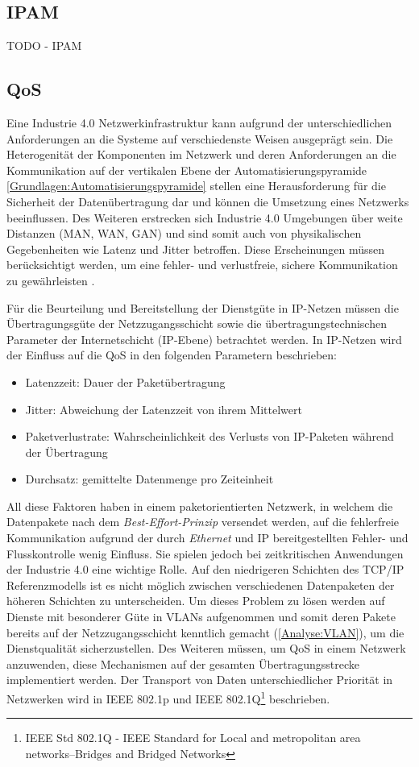 \subsection{IPAM}
TODO - IPAM

\subsection{\ac{QoS}}
Eine Industrie 4.0 Netzwerkinfrastruktur kann aufgrund der unterschiedlichen Anforderungen an die Systeme auf verschiedenste Weisen ausgeprägt sein. Die Heterogenität der Komponenten im Netzwerk und deren Anforderungen an die Kommunikation auf der vertikalen Ebene der Automatisierungspyramide \autoref{Grundlagen:Automatisierungspyramide} stellen eine Herausforderung für die Sicherheit der Datenübertragung dar und können die Umsetzung eines Netzwerks beeinflussen. Des Weiteren erstrecken sich Industrie 4.0 Umgebungen über weite Distanzen (\ac{MAN}, \ac{WAN}, \ac{GAN}) und sind somit auch von physikalischen Gegebenheiten wie Latenz und Jitter betroffen. Diese Erscheinungen müssen berücksichtigt werden, um eine fehler- und verlustfreie, sichere Kommunikation zu gewährleisten \cite{torscht2014}.

Für die Beurteilung und Bereitstellung der Dienstgüte in \ac{IP}-Netzen müssen die Übertragungsgüte der Netzzugangsschicht sowie die übertragungstechnischen Parameter der Internetschicht (\ac{IP}-Ebene) betrachtet werden. In IP-Netzen wird der Einfluss auf die \ac{QoS} in den folgenden Parametern beschrieben:
\begin{itemize}
    \item Latenzzeit: Dauer der Paketübertragung
    \item Jitter: Abweichung der Latenzzeit von ihrem Mittelwert
    \item Paketverlustrate: Wahrscheinlichkeit des Verlusts von IP-Paketen während der Übertragung
    \item Durchsatz: gemittelte Datenmenge pro Zeiteinheit
\end{itemize}
All diese Faktoren haben in einem paketorientierten Netzwerk, in welchem die Datenpakete nach dem \textit{Best-Effort-Prinzip} versendet werden, auf die fehlerfreie Kommunikation aufgrund der durch \textit{Ethernet} und \ac{IP} bereitgestellten Fehler- und Flusskontrolle wenig Einfluss. Sie spielen jedoch bei zeitkritischen Anwendungen der Industrie 4.0 eine wichtige Rolle. Auf den niedrigeren Schichten des \ac{TCP}/\ac{IP} Referenzmodells ist es nicht möglich zwischen verschiedenen Datenpaketen der höheren Schichten zu unterscheiden. Um dieses Problem zu lösen werden auf Dienste mit besonderer Güte in \ac{VLAN}s aufgenommen und somit deren Pakete bereits auf der Netzzugangsschicht kenntlich gemacht (\autoref{Analyse:VLAN}), um die Dienstqualität sicherzustellen. Des Weiteren müssen, um \ac{QoS} in einem Netzwerk anzuwenden, diese Mechanismen auf der gesamten Übertragungsstrecke implementiert werden. Der Transport von Daten unterschiedlicher Priorität in Netzwerken wird in \ac{IEEE} 802.1p und \ac{IEEE} 802.1Q\footnote{IEEE Std 802.1Q - IEEE Standard for Local and metropolitan area networks--Bridges and Bridged Networks} beschrieben.


